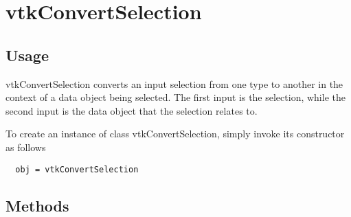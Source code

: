 \section{vtkConvertSelection}

\subsection{Usage}

 vtkConvertSelection converts an input selection from one type to another
 in the context of a data object being selected. The first input is the
 selection, while the second input is the data object that the selection
 relates to.


To create an instance of class vtkConvertSelection, simply
invoke its constructor as follows
\begin{verbatim}
  obj = vtkConvertSelection
\end{verbatim}
\subsection{Methods}

